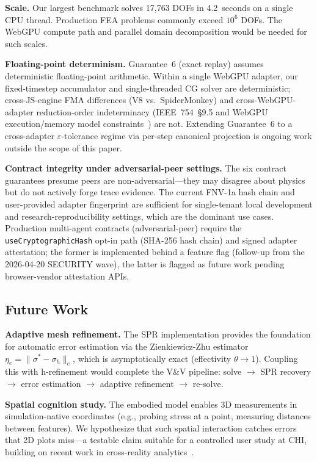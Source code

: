 \documentclass[journal]{IEEEtran}
\begin{document}
\textbf{Scale.} Our largest benchmark solves 17,763 DOFs in 4.2~seconds on
a single CPU thread. Production FEA problems commonly exceed $10^6$ DOFs.
The WebGPU compute path and parallel domain decomposition would be needed
for such scales.

\textbf{Floating-point determinism.} Guarantee~6 (exact replay) assumes
deterministic floating-point arithmetic. Within a single WebGPU adapter,
our fixed-timestep accumulator and single-threaded CG solver are
deterministic; cross-JS-engine FMA differences (V8 vs.\ SpiderMonkey) and
cross-WebGPU-adapter reduction-order indeterminacy (IEEE~754~\S9.5 and
WebGPU execution/memory model constraints~\cite{IEEE7542019,WebGPUSpec})
are not. Extending Guarantee~6 to a cross-adapter
$\varepsilon$-tolerance regime via per-step canonical projection is
ongoing work outside the scope of this paper.

\textbf{Contract integrity under adversarial-peer settings.}
The six contract guarantees presume peers are non-adversarial---they may
disagree about physics but do not actively forge trace evidence. The current
FNV-1a hash chain and user-provided adapter fingerprint are sufficient for
single-tenant local development and research-reproducibility settings, which
are the dominant use cases. Production multi-agent contracts (adversarial-peer)
require the \texttt{useCryptographicHash} opt-in path (SHA-256 hash chain) and
signed adapter attestation; the former is implemented behind a feature flag
(follow-up from the 2026-04-20 SECURITY wave), the latter is flagged as future
work pending browser-vendor attestation APIs.

\subsection{Future Work}

\textbf{Adaptive mesh refinement.} The SPR implementation provides the
foundation for automatic error estimation via the Zienkiewicz-Zhu
estimator $\eta_e = \|\sigma^* - \sigma_h\|_e$, which is asymptotically
exact (effectivity $\theta \to 1$). Coupling this with h-refinement
would complete the V\&V pipeline: solve $\to$ SPR recovery $\to$ error
estimation $\to$ adaptive refinement $\to$ re-solve.

\textbf{Spatial cognition study.} The embodied model enables 3D
measurements in simulation-native coordinates (e.g., probing stress at a
point, measuring distances between features). We hypothesize that such
spatial interaction catches errors that 2D plots miss---a testable claim
suitable for a controlled user study at CHI, building on recent work in
cross-reality analytics~\cite{DashSpace2025}.
\end{document}

